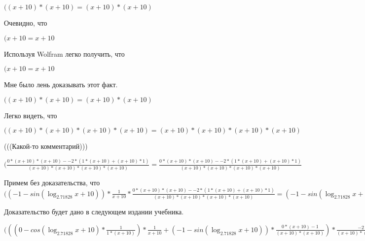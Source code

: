 \documentclass[12pt,a4paper,fleqn]{article}
\theoremstyle{definition}
\begin{document}
$(( x  +  10 ) * ( x  +  10 ) = ( x  +  10 ) * ( x  +  10 )$

Очевидно, что

$( x  +  10  =  x  +  10 $

Используя Wolfram легко получить, что

$( x  +  10  =  x  +  10 $

Мне было лень доказывать этот факт.

$(( x  +  10 ) * ( x  +  10 ) = ( x  +  10 ) * ( x  +  10 )$

Легко видеть, что

$(( x  +  10 ) * ( x  +  10 ) * ( x  +  10 ) * ( x  +  10 ) = ( x  +  10 ) * ( x  +  10 ) * ( x  +  10 ) * ( x  +  10 )$

(((Какой-то комментарий)))

$(\frac{ 0  * ( x  +  10 ) * ( x  +  10 ) -  -2  * ( 1  * ( x  +  10 ) + ( x  +  10 ) *  1 )}{( x  +  10 ) * ( x  +  10 ) * ( x  +  10 ) * ( x  +  10 )}
 = \frac{ 0  * ( x  +  10 ) * ( x  +  10 ) -  -2  * ( 1  * ( x  +  10 ) + ( x  +  10 ) *  1 )}{( x  +  10 ) * ( x  +  10 ) * ( x  +  10 ) * ( x  +  10 )}
$

Примем без доказательства, что
$(( -1  - sin(\log_{ 2.71828 }{ x  +  10 })) * \frac{ 1 }{ x  +  10 }
 * \frac{ 0  * ( x  +  10 ) * ( x  +  10 ) -  -2  * ( 1  * ( x  +  10 ) + ( x  +  10 ) *  1 )}{( x  +  10 ) * ( x  +  10 ) * ( x  +  10 ) * ( x  +  10 )}
 = ( -1  - sin(\log_{ 2.71828 }{ x  +  10 })) * \frac{ 1 }{ x  +  10 }
 * \frac{ 0  * ( x  +  10 ) * ( x  +  10 ) -  -2  * ( 1  * ( x  +  10 ) + ( x  +  10 ) *  1 )}{( x  +  10 ) * ( x  +  10 ) * ( x  +  10 ) * ( x  +  10 )}
$

Доказательство будет дано в следующем издании учебника.

$((( 0  - cos(\log_{ 2.71828 }{ x  +  10 }) * \frac{ 1 }{ 1  * ( x  +  10 )}
) * \frac{ 1 }{ x  +  10 }
 + ( -1  - sin(\log_{ 2.71828 }{ x  +  10 })) * \frac{ 0  * ( x  +  10 ) -  1 }{( x  +  10 ) * ( x  +  10 )}
) * \frac{ -2 }{( x  +  10 ) * ( x  +  10 )}
 + ( -1  - sin(\log_{ 2.71828 }{ x  +  10 })) * \frac{ 1 }{ x  +  10 }
 * \frac{ 0  * ( x  +  10 ) * ( x  +  10 ) -  -2  * ( 1  * ( x  +  10 ) + ( x  +  10 ) *  1 )}{( x  +  10 ) * ( x  +  10 ) * ( x  +  10 ) * ( x  +  10 )}
 = (( 0  - cos(\log_{ 2.71828 }{ x  +  10 }) * \frac{ 1 }{ 1  * ( x  +  10 )}
) * \frac{ 1 }{ x  +  10 }
 + ( -1  - sin(\log_{ 2.71828 }{ x  +  10 })) * \frac{ 0  * ( x  +  10 ) -  1 }{( x  +  10 ) * ( x  +  10 )}
) * \frac{ -2 }{( x  +  10 ) * ( x  +  10 )}
 + ( -1  - sin(\log_{ 2.71828 }{ x  +  10 })) * \frac{ 1 }{ x  +  10 }
 * \frac{ 0  * ( x  +  10 ) * ( x  +  10 ) -  -2  * ( 1  * ( x  +  10 ) + ( x  +  10 ) *  1 )}{( x  +  10 ) * ( x  +  10 ) * ( x  +  10 ) * ( x  +  10 )}
$
\end{document}

